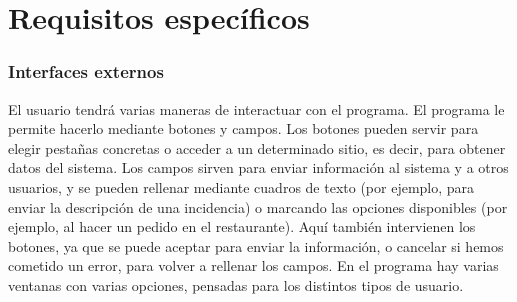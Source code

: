 \documentclass[spanish,a4paper,12pt]{report}	%
\begin{document}
\newpage
\mbox{}
\thispagestyle{empty}						%
\newpage

\setcounter{section}{0}

\part{Requisitos específicos}



		\section{Interfaces externos}
			
			El usuario tendrá varias maneras de interactuar con el programa. El programa le permite hacerlo mediante botones y campos. Los botones pueden servir para elegir pestañas concretas o acceder a un determinado sitio, es decir, para obtener datos del sistema. Los campos sirven para enviar información al sistema y a otros usuarios, y se pueden rellenar mediante cuadros de texto (por ejemplo, para enviar la descripción de una incidencia) o marcando las opciones disponibles (por ejemplo, al hacer un pedido en el restaurante). Aquí también intervienen los botones, ya que se puede aceptar para enviar la información, o cancelar si hemos cometido un error, para volver a rellenar los campos. En el programa hay varias ventanas con varias opciones, pensadas para los distintos tipos de usuario.
\end{document}
